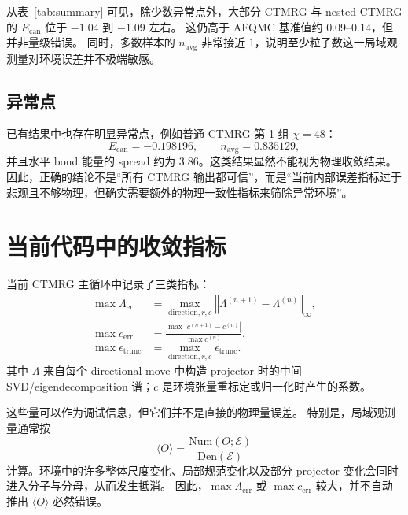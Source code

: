\documentclass[11pt,a4paper]{ctexart}
\newcommand{\ctmrg}{CTMRG}
\newcommand{\Ecan}{E_{\mathrm{can}}}
\newcommand{\nb}{n_{\mathrm{avg}}}
\begin{document}
从表~\ref{tab:summary} 可见，除少数异常点外，大部分 \ctmrg{} 与 nested \ctmrg{} 的 $\Ecan$ 位于 $-1.04$ 到 $-1.09$ 左右。
这仍高于 AFQMC 基准值约 $0.09$--$0.14$，但并非量级错误。
同时，多数样本的 $\nb$ 非常接近 $1$，说明至少粒子数这一局域观测量对环境误差并不极端敏感。

\subsection{异常点}

已有结果中也存在明显异常点，例如普通 \ctmrg{} 第 1 组 $\chi=48$：
\begin{equation}
  \Ecan=-0.198196,\qquad \nb=0.835129,
\end{equation}
并且水平 bond 能量的 spread 约为 $3.86$。这类结果显然不能视为物理收敛结果。
因此，正确的结论不是“所有 \ctmrg{} 输出都可信”，而是“当前内部误差指标过于悲观且不够物理，但确实需要额外的物理一致性指标来筛除异常环境”。

\section{当前代码中的收敛指标}

当前 \ctmrg{} 主循环中记录了三类指标：
\begin{align}
  \max\Lambda_{\mathrm{err}}
  &=
  \max_{\mathrm{direction},r,c}
  \left\Vert
    \Lambda^{(n+1)}-\Lambda^{(n)}
  \right\Vert_{\infty},
  \label{eq:lambda-err}\\
  \max c_{\mathrm{err}}
  &=
  \frac{
    \max |c^{(n+1)}-c^{(n)}|
  }{
    \max c^{(n)}
  },
  \label{eq:coef-err}\\
  \max\epsilon_{\mathrm{trunc}}
  &=
  \max_{\mathrm{direction},r,c}
  \epsilon_{\mathrm{trunc}} .
  \label{eq:trunc-err}
\end{align}
其中 $\Lambda$ 来自每个 directional move 中构造 projector 时的中间 SVD/eigendecomposition 谱；$c$ 是环境张量重标定或归一化时产生的系数。

这些量可以作为调试信息，但它们并不是直接的物理量误差。
特别是，局域观测量通常按
\begin{equation}
  \langle O\rangle
  =
  \frac{\mathrm{Num}(O;\mathcal{E})}{\mathrm{Den}(\mathcal{E})}
  \label{eq:observable-ratio}
\end{equation}
计算。环境中的许多整体尺度变化、局部规范变化以及部分 projector 变化会同时进入分子与分母，从而发生抵消。
因此，$\max\Lambda_{\mathrm{err}}$ 或 $\max c_{\mathrm{err}}$ 较大，并不自动推出 $\langle O\rangle$ 必然错误。
\end{document}
